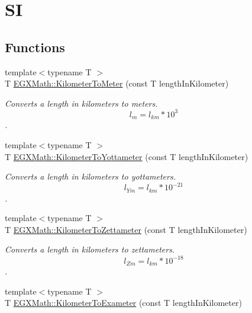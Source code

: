 \hypertarget{group___e_g_x_math-_conversions-_length_conversions-_s_i-_kilometer-_s_i}{}\section{SI}
\label{group___e_g_x_math-_conversions-_length_conversions-_s_i-_kilometer-_s_i}
\subsection*{Functions}
\begin{DoxyCompactItemize}
\item 
{\footnotesize template$<$typename T $>$ }\\T \mbox{\hyperlink{group___e_g_x_math-_conversions-_length_conversions-_s_i-_kilometer-_s_i_ga0c3c04124b670e73baa39fb7c9ed5846}{E\+G\+X\+Math\+::\+Kilometer\+To\+Meter}} (const T length\+In\+Kilometer)
\begin{DoxyCompactList}\small\item\em Converts a length in kilometers to meters. \[ l_{m}=l_{km} * 10^{3} \]. \end{DoxyCompactList}\item 
{\footnotesize template$<$typename T $>$ }\\T \mbox{\hyperlink{group___e_g_x_math-_conversions-_length_conversions-_s_i-_kilometer-_s_i_gaf29070fac412b7a92466866b2ae32337}{E\+G\+X\+Math\+::\+Kilometer\+To\+Yottameter}} (const T length\+In\+Kilometer)
\begin{DoxyCompactList}\small\item\em Converts a length in kilometers to yottameters. \[ l_{Ym}=l_{km} * 10^{-21} \]. \end{DoxyCompactList}\item 
{\footnotesize template$<$typename T $>$ }\\T \mbox{\hyperlink{group___e_g_x_math-_conversions-_length_conversions-_s_i-_kilometer-_s_i_ga85792ebcdaa5c8289da781417c88963d}{E\+G\+X\+Math\+::\+Kilometer\+To\+Zettameter}} (const T length\+In\+Kilometer)
\begin{DoxyCompactList}\small\item\em Converts a length in kilometers to zettameters. \[ l_{Zm}=l_{km} * 10^{-18} \]. \end{DoxyCompactList}\item 
{\footnotesize template$<$typename T $>$ }\\T \mbox{\hyperlink{group___e_g_x_math-_conversions-_length_conversions-_s_i-_kilometer-_s_i_gae947c63c1b914d80d7ed3b35df15d02a}{E\+G\+X\+Math\+::\+Kilometer\+To\+Exameter}} (const T length\+In\+Kilometer)

\end{DoxyCompactItemize}
